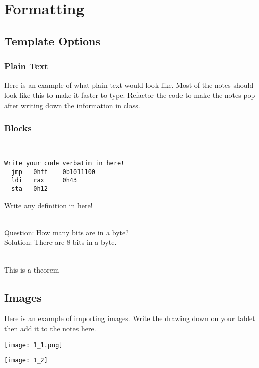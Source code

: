 \documentclass[11pt,fleqn,openany]{book} %
\begin{document}
\chapter{Formatting}
\section{Template Options}
\subsection{Plain Text}
Here is an example of what plain text would look like. Most of the notes should look like this to make it faster to type. Refactor the code to make the notes pop after writing down the information in class.
\subsection{Blocks}

\begin{code}~\\
\begin{verbatim}
Write your code verbatim in here!
  jmp   0hff    0b1011100   
  ldi   rax     0h43 
  sta   0h12  
\end{verbatim}
\end{code}

\begin{definition}
Write any definition in here!
\end{definition}

\begin{example}~\\
  Question: How many bits are in a byte?\\ 
  Solution: There are 8 bits in a byte.
\end{example}

\begin{theorem}~\\
This is a theorem
\end{theorem}


\section{Images}
Here is an example of importing images. Write the drawing down on your tablet then add it to the notes here.\\
\begin{center}
  \texttt{[image: 1\_1.png]}
  \begin{capfig}
  \end{capfig}

  \texttt{[image: 1\_2]}
  \begin{capfig}
  \end{capfig}

\end{center}
\end{document}

